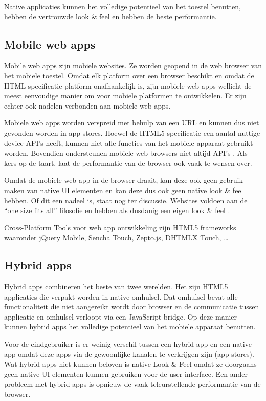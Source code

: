 \documentclass[a4paper,conference]{IEEEconf}
\begin{document}
Native applicaties kunnen het volledige potentieel van het toestel benutten, hebben de vertrouwde look \& feel en hebben de beste performantie. 

\subsection{Mobile web apps}

Mobile web apps zijn mobiele websites. Ze worden geopend in de web browser van het mobiele toestel. Omdat elk platform over een browser beschikt en omdat de HTML-specificatie platform onafhankelijk is, zijn mobiele web apps wellicht de meest eenvoudige manier om voor mobiele platformen te ontwikkelen. Er zijn echter ook nadelen verbonden aan mobiele web apps.

Mobiele web apps worden verspreid met behulp van een URL en kunnen dus niet gevonden worden in app stores. Hoewel de HTML5 specificatie een aantal nuttige device API's heeft, kunnen niet alle functies van het mobiele apparaat gebruikt worden. Bovendien ondersteunen mobiele web browsers niet altijd API's \cite{Firtman:2012}. Als kers op de taart, laat de performantie van de browser ook vaak te wensen over.

Omdat de mobiele web app in de browser draait, kan deze ook geen gebruik maken van native UI elementen en kan deze dus ook geen native look \& feel hebben. Of dit een nadeel is, staat nog ter discussie. Websites voldoen aan de ``one size fits all'' filosofie en hebben als dusdanig een eigen look \& feel \cite{Mahemoff:2011}.

Cross-Platform Tools voor web app ontwikkeling zijn HTML5 frameworks waaronder jQuery Mobile, Sencha Touch, Zepto.js, DHTMLX Touch, \ldots

\subsection{Hybrid apps}

Hybrid apps combineren het beste van twee werelden. Het zijn HTML5 applicaties die verpakt worden in native omhulsel. Dat omhulsel bevat alle functionaliteit die niet aangereikt wordt door browser en de communicatie tussen applicatie en omhulsel verloopt via een JavaScript bridge. Op deze manier kunnen hybrid apps het volledige potentieel van het mobiele apparaat benutten.

Voor de eindgebruiker is er weinig verschil tussen een hybrid app en een native app omdat deze apps via de gewoonlijke kanalen te verkrijgen zijn (app stores). Wat hybrid apps niet kunnen beloven is native Look \& Feel omdat ze doorgaans geen native UI elementen kunnen gebruiken voor de user interface. Een ander probleem met hybrid apps is opnieuw de vaak teleurstellende performantie van de browser. 
\end{document}
